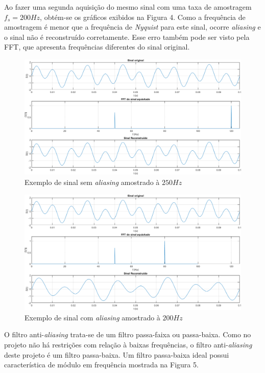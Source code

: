 \documentclass[11pt]{abntex2}
\begin{document}
				Ao fazer uma segunda aquisição do mesmo sinal com uma taxa de
				amostragem $f_s = 200Hz$, obtém-se os gráficos exibidos na
				Figura 4. Como a frequência de amostragem é menor que a
				frequência de \textit{Nyquist} para este sinal, ocorre
				\textit{aliasing} e o sinal não é reconstruído corretamente.
				Esse erro também pode ser visto pela FFT, que apresenta
				frequências diferentes do sinal original.

				\newpage

				\begin{figure}[!ht]
					\centering
					\includegraphics[width=\linewidth]{../../Fotos/aliasingFs250.png}
					\caption{Exemplo de sinal sem \textit{aliasing} amostrado à $250Hz$}
				\end{figure}

				\begin{figure}[H]
					\centering
					\includegraphics[width=\linewidth]{../../Fotos/aliasingFs200.png}
					\caption{Exemplo de sinal com \textit{aliasing} amostrado à $200Hz$}
				\end{figure}

				\pagebreak


				O filtro anti-\textit{aliasing} trata-se de um filtro passa-faixa
				ou passa-baixa. Como no projeto não há restrições com relação à
				baixas frequências, o filtro anti-\textit{aliasing} deste projeto
				é um filtro passa-baixa. Um filtro passa-baixa ideal possui
				característica de módulo em frequência mostrada na Figura 5.
\end{document}
